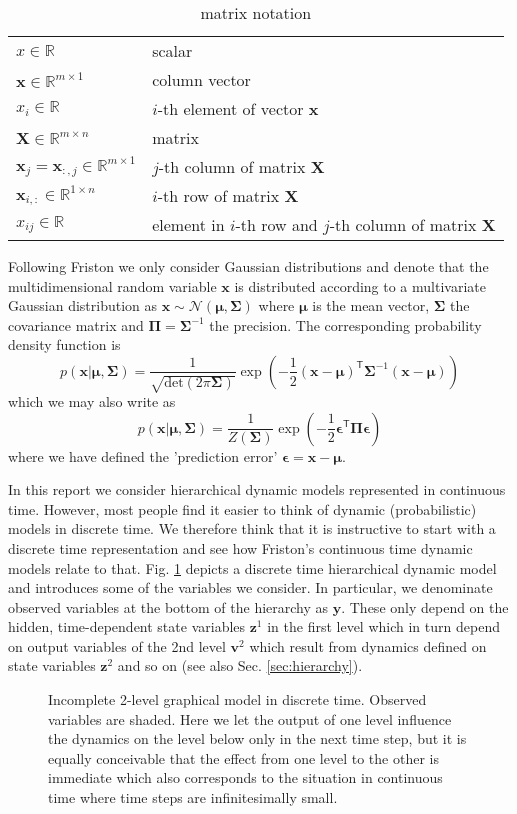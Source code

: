 \documentclass[a4paper,10pt]{article}
\newcommand{\bs}[1]{\mathbf{#1}}					%
\newcommand{\bgs}[1]{\boldsymbol{#1}}				%
\newcommand{\tr}{\mathsf{T}}				%
\newcommand{\eq}[1]{\begin{equation} #1 \end{equation}}%
\renewcommand{\ss}{z}         %
\newcommand{\sv}{v}         %
\newcommand{\so}{y}         %
\newcommand{\spe}{\epsilon} %
\newcommand{\spm}{\mu}    %
\newcommand{\ps}{\bs{\ss}}    %
\newcommand{\pv}{\bs{\sv}}    %
\newcommand{\po}{\bs{\so}}    %
\newcommand{\ppe}{\bgs{\spe}} %
\newcommand{\ppm}{\bgs{\spm}}   %
\newcommand{\N}{\mathcal{N}}			%
\newcommand{\R}{\mathbb{R}}				%
\newcommand{\Cov}{\bgs{\Sigma}}			%
\newcommand{\Prec}{\bgs{\Pi}}			%
\renewcommand{\det}[1]{\mathrm{det}(#1)}	%
\begin{document}
\begin{table}
\begin{tabular}{ll}
$x \in \R$ & scalar\\
$\bs{x} \in \R^{m\times 1}$ & column vector\\
$x_i \in \R$ & $i$-th element of vector $\bs{x}$\\
$\bs{X} \in \R^{m\times n}$ & matrix\\
$\bs{x}_j = \bs{x}_{:,j} \in \R^{m\times 1}$ & $j$-th column of matrix $\bs{X}$\\
$\bs{x}_{i,:} \in \R^{1\times n}$ & $i$-th row of matrix $\bs{X}$\\
$x_{ij}\in \R$ & element in $i$-th row and $j$-th column of matrix $\bs{X}$
\end{tabular}
\caption{matrix notation}
\label{tab:matrixnot}
\end{table}

Following Friston we only consider Gaussian distributions and denote that the multidimensional random variable $\bs{x}$ is distributed according to a multivariate Gaussian distribution as $\bs{x} \sim \N(\ppm, \Cov)$ where $\ppm$ is the mean vector, $\Cov$ the covariance matrix and $\Prec = \Cov^{-1}$ the precision. The corresponding probability density function is
\eq{
    p(\bs{x}|\ppm,\Cov) = \frac{1}{\sqrt{\det{2\pi \Cov}}}\exp\left( -\frac{1}{2}(\bs{x} - \ppm)^\tr\Cov^{-1} (\bs{x} - \ppm) \right)
}
which we may also write as
\eq{
    p(\bs{x}|\ppm,\Cov) = \frac{1}{Z(\Cov)}\exp\left( -\frac{1}{2}\ppe^\tr\Prec \ppe \right)
}
where we have defined the 'prediction error' $\ppe = \bs{x} - \ppm$.

In this report we consider hierarchical dynamic models represented in continuous time. However, most people find it easier to think of dynamic (probabilistic) models in discrete time. We therefore think that it is instructive to start with a discrete time representation and see how Friston's continuous time dynamic models relate to that. Fig. \ref{fig:graphicalModel} depicts a discrete time hierarchical dynamic model and introduces some of the variables we consider. In particular, we denominate observed variables at the bottom of the hierarchy as $\po$. These only depend on the hidden, time-dependent state variables $\ps^1$ in the first level which in turn depend on output variables of the 2nd level $\pv^2$ which result from dynamics defined on state variables $\ps^2$ and so on (see also Sec. \ref{sec:hierarchy}).

\begin{figure}
    \centering
    
    \label{fig:graphicalModel}
    \caption{Incomplete 2-level graphical model in discrete time. Observed variables are shaded. Here we let the output of one level influence the dynamics on the level below only in the next time step, but it is equally conceivable that the effect from one level to the other is immediate which also corresponds to the situation in continuous time where time steps are infinitesimally small.}
\end{figure}
\end{document}
